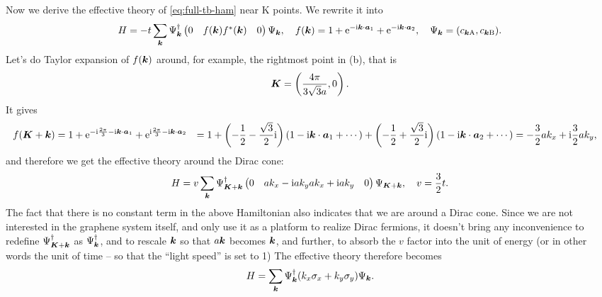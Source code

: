 \documentclass[hyperref, a4paper]{article}
\newcommand*{\ii}{\mathrm{i}}
\newcommand*{\ee}{\mathrm{e}}
\def\\{}%
\begin{document}
Now we derive the effective theory of \eqref{eq:full-tb-ham} near K points.
We rewrite it into 
\begin{equation}
    H = - t \sum_{\vb*{k}} \Psi^\dagger_{\vb*{k}} \pmqty{
        0 & f(\vb*{k}) \\ f^*(\vb*{k}) & 0
    } \Psi_{\vb*{k}}, \quad 
    f(\vb*{k}) = 1 + \ee^{- \ii \vb*{k} \cdot \vb*{a}_1} + \ee^{- \ii \vb*{k} \cdot \vb*{a}_2}, \quad 
    \Psi_{\vb*{k}} = (c_{\vb*{k} \text{A}}, c_{\vb*{k} \text{B}}).
\end{equation}
Let's do Taylor expansion of $f(\vb*{k})$ around, for example, the rightmost point in (b),
that is
\begin{equation}
    \vb*{K} = \left( \frac{4\pi}{3\sqrt{3} a}, 0 \right).
\end{equation}
It gives 
\begin{equation}
    \begin{aligned}
        f(\vb*{K} + \vb*{k}) &= 
        1 + \ee^{- \ii \frac{2\pi}{3} - \ii \vb*{k} \cdot \vb*{a}_1} 
        + \ee^{\ii \frac{2\pi}{3} - \ii \vb*{k} \cdot \vb*{a}_2} \\
        &= 1 + \left( - \frac{1}{2} - \frac{\sqrt{3}}{2} \ii \right) (1 - \ii \vb*{k} \cdot \vb*{a}_1 + \cdots)
        + \left( - \frac{1}{2} + \frac{\sqrt{3}}{2} \ii \right) (1 - \ii \vb*{k} \cdot \vb*{a}_2 + \cdots) \\
        &= - \frac{3}{2} a k_x + \ii \frac{3}{2} a k_y,
    \end{aligned}
    \label{eq:f-func}
\end{equation}
and therefore we get the effective theory around the Dirac cone:
\begin{equation}
    H = v \sum_{\vb*{k}} \Psi^\dagger_{\vb*{K} + \vb*{k}}
    \pmqty{
        0 & a k_x - \ii a k_y \\
        a k_x + \ii a k_y & 0
    } \Psi_{\vb*{K} + \vb*{k}}, \quad 
    v = \frac{3}{2} t.
\end{equation}
The fact that there is no constant term in the above Hamiltonian also indicates that 
we are around a Dirac cone.
Since we are not interested in the graphene system itself, 
and only use it as a platform to realize Dirac fermions,
it doesn't bring any inconvenience to redefine $\Psi^\dagger_{\vb*{K} + \vb*{k}}$ as $\Psi^\dagger_{\vb*{k}}$,
and to rescale $\vb*{k}$ so that $a \vb*{k}$ becomes $\vb*{k}$,
and further, to absorb the $v$ factor into the unit of energy 
(or in other words the unit of time -- so that the ``light speed'' is set to 1)
The effective theory therefore becomes 
\begin{equation}
    H = \sum_{\vb*{k}} \Psi^\dagger_{\vb*{k}} (k_x \sigma_x + k_y \sigma_y) \Psi_{\vb*{k}}.
    \label{eq:eff-ham-k}
\end{equation}
\end{document}
